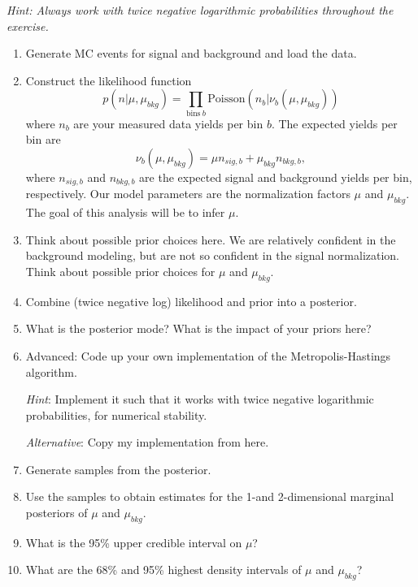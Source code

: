 \documentclass{article}
\begin{document}
\textit{Hint: Always work with twice negative logarithmic probabilities throughout the exercise.}
\begin{enumerate}
    \item Generate MC events for signal and background and load the data. %

    \item Construct the likelihood function
    $$p(n|\mu, \mu_{bkg}) = \prod_{\mathrm{bins}~b} \mathrm{Poisson}(n_b|\nu_b(\mu, \mu_{bkg}))$$
    where $n_b$ are your measured data yields per bin $b$. The expected yields per bin are
    $$\nu_b(\mu, \mu_{bkg}) = \mu n_{sig,b} + \mu_{bkg} n_{bkg, b},$$
    where $n_{sig,b}$ and $n_{bkg,b}$ are the expected signal and background yields per bin, respectively. Our model parameters are the normalization factors $\mu$ and $\mu_{bkg}$. The goal of this analysis will be to infer $\mu$.

    \item Think about possible prior choices here. We are relatively confident in the background modeling, but are not so confident in the signal normalization. Think about possible prior choices for $\mu$ and $\mu_{bkg}$.

    \item Combine (twice negative log) likelihood and prior into a posterior.

    \item What is the posterior mode? What is the impact of your priors here?


    \item {Advanced}: Code up your own implementation of the Metropolis-Hastings algorithm.

    \textit{Hint}: Implement it such that it works with twice negative logarithmic probabilities, for numerical stability.

    \textit{Alternative}: Copy my implementation from here. %

    \item Generate samples from the posterior.

    \item Use the samples to obtain estimates for the 1-and 2-dimensional marginal posteriors of $\mu$ and $\mu_{bkg}$.

    \item What is the 95\% upper credible interval on $\mu$?

    \item What are the 68\% and 95\% highest density intervals of $\mu$ and $\mu_{bkg}$?

\end{enumerate}
\end{document}
